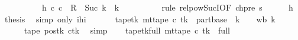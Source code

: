 \begin{isabellebody}
\ \ \isamarkupfalse%
\ {\isacharminus}{\kern0pt}\isanewline
\ \ \ \ \isamarkupfalse%
\ h{\isacharcolon}{\kern0pt}\ {\isachardoublequoteopen}{\isacharparenleft}{\kern0pt}c{\isacharprime}{\kern0pt}{\isacharcomma}{\kern0pt}\ c{}{\isacharparenright}{\kern0pt}\ {\isasymin}\ {\isacharquery}{\kern0pt}R\ {\isacharcircum}{\kern0pt}{\isacharcircum}{\kern0pt}\ Suc\ {\isacharparenleft}{\kern0pt}{\isacharquery}{\kern0pt}k\ {\isacharplus}{\kern0pt}\ {\isacharparenleft}{\kern0pt}{\isacharquery}{\kern0pt}k\ {\isacharminus}{\kern0pt}\ {}{\isacharparenright}{\kern0pt}{\isacharparenright}{\kern0pt}{\isachardoublequoteclose}\isanewline
\ \ \ \ \ \ \isamarkupfalse%
\ {\isacharparenleft}{\kern0pt}rule\ relpow{\isacharunderscore}{\kern0pt}Suc{\isacharunderscore}{\kern0pt}I{\isacharbrackleft}{\kern0pt}OF\ ch{\isacharunderscore}{\kern0pt}pre\ s{}{\isacharbrackright}{\kern0pt}{\isacharparenright}{\kern0pt}\isanewline
\ \ \ \ \isamarkupfalse%
\ h\ \isamarkupfalse%
\ {\isacharquery}{\kern0pt}thesis\ \isamarkupfalse%
\ {\isacharparenleft}{\kern0pt}simp\ only{\isacharcolon}{\kern0pt}\ ihi{\isacharparenright}{\kern0pt}\isanewline
\ \ \isamarkupfalse%
\isanewline
\ \ \isamarkupfalse%
\ tape{}{\isacharunderscore}{\kern0pt}tk{\isacharcolon}{\kern0pt}\ {\isachardoublequoteopen}mt{\isacharunderscore}{\kern0pt}tape\ c{}\ tk\ {\isacharequal}{\kern0pt}\ {\isacharparenleft}{\kern0pt}{\isacharquery}{\kern0pt}part{\isacharparenleft}{\kern0pt}base\ {\isacharplus}{\kern0pt}\ {\isacharparenleft}{\kern0pt}{\isacharquery}{\kern0pt}k\ {\isacharminus}{\kern0pt}\ {}{\isacharparenright}{\kern0pt}\ {\isacharcolon}{\kern0pt}{\isacharequal}{\kern0pt}\ {\isacharquery}{\kern0pt}wb\ {\isacharparenleft}{\kern0pt}{\isacharquery}{\kern0pt}k\ {\isacharminus}{\kern0pt}\ {}{\isacharparenright}{\kern0pt}{\isacharparenright}{\kern0pt}{\isacharparenright}{\kern0pt}{\isachardoublequoteclose}\isanewline
\ \ \ \ \isamarkupfalse%
\ tape{}\ pos{}{\isacharunderscore}{\kern0pt}tk\ c{}tk\ \isamarkupfalse%
\ simp\isanewline
\ \ \isamarkupfalse%
\ tape{}{\isacharunderscore}{\kern0pt}tk{\isacharunderscore}{\kern0pt}full{\isacharcolon}{\kern0pt}\ {\isachardoublequoteopen}mt{\isacharunderscore}{\kern0pt}tape\ c{}\ tk\ {\isacharequal}{\kern0pt}\ {\isacharquery}{\kern0pt}full{\isachardoublequoteclose}\isanewline

\end{isabellebody}
